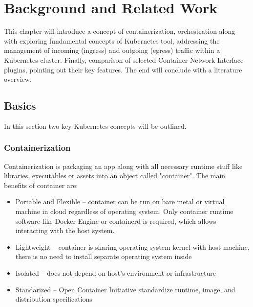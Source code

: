 \chapter{Background and Related Work}
\label{cha:background}

This chapter will introduce a concept of containerization, orchestration along with exploring fundamental concepts of Kubernetes tool, addressing the management of incoming (ingress) and outgoing (egress) traffic within a Kubernetes cluster. Finally, comparison of selected Container Network Interface plugins, pointing out their key features. The end will conclude with a literature overview.


\section{Basics}
\label{sec:basics}

In this section two key Kubernetes concepts will be outlined.

\subsection{Containerization}
\label{sec:containerization}

Containerization is packaging an app along with all necessary runtime stuff like libraries, executables or assets into an object called "container". The main benefits of container are\cite{RedhatContainerization}: 

\begin{itemize} 
    \item Portable and Flexible -- container can be run on bare metal or virtual machine in cloud regardless of operating system. Only container runtime software like Docker Engine or containerd is required, which allows interacting with the host system. 

    \item Lightweight -- container is sharing operating system kernel with host machine, there is no need to install separate operating system inside 

    \item Isolated -- does not depend on host's environment or infrastructure 

    \item Standarized -- Open Container Initiative standardize runtime, image, and distribution specifications 

\end{itemize} 

